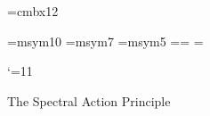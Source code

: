 
\hsize=125mm
\vsize=180mm
\hoffset=3mm
\voffset=12mm

\baselineskip=14pt


\font\twelvebf=cmbx12

\font\tenbb=msym10
\font\sevenbb=msym7
\font\fivebb=msym5
\newfam\bbfam
\textfont\bbfam=\tenbb \scriptfont\bbfam=\sevenbb
\scriptscriptfont\bbfam=\fivebb
\def\bb{\fam\bbfam}

\def\Cb{{\bb C}}
\def\Hb{{\bb H}}
\def\Rb{{\bb R}}
\def\Ab{{\bb A}}
\def\Bb{{\bb B}}
\def\Eb{{\bb E}}
\def\Zb{{\bb Z}}


\def\Ac{{\cal A}}
\def\Hc{{\cal H}}
\def\Lc{{\cal L}}
\def\Uc{{\cal U}}


\def\Diff{\mathop{\rm Diff}\nolimits}
\def\Aut{\mathop{\rm Aut}\nolimits}
\def\Trace{\mathop{\rm Trace}\nolimits}
\def\Spectrum{\mathop{\rm Spectrum}\nolimits}
\def\Tr{\mathop{\rm Tr}\nolimits}
\def\Re{\mathop{\rm Re}\nolimits}
\def\Res{\mathop{\rm Res}\nolimits}
\def\Gev{\mathop{\rm Gev}\nolimits}
\def\range{\mathop{\rm range}\nolimits}
\def\Int{\mathop{\rm Int}\nolimits}
\def\Out{\mathop{\rm Out}\nolimits}
\def\Sup{\mathop{\rm Sup}\nolimits}


\def\Lb{\Lambda}
\def\lb{\lambda}
\def\g{\gamma}
\def\vp{\varphi}
\def\a{\alpha}
\def\b{\beta}
\def\g{\gamma}
\def\G{\Gamma}
\def\s{\sigma}
\def\Si{\Sigma}
\def\om{\omega}
\def\Om{\Omega}
\def\d{\delta}
\def\t{\theta}
\def\k{\kappa}
\def\ve{\varepsilon}

\def\ts{\times}
\def\ify{\infty}
\def\fl{\forall}
\def\op{\oplus}
\def\ra{\rightarrow}
\def\wt{\widetilde}
\def\ot{\otimes}
\def\part{\partial}
\def\lgl{\langle}
\def\rgl{\rangle}
\def\nb{\nabla}
\def\eqv{\equiv}
\def\apx{\approx}
\def\sm{\simeq}
\def\sbs{\subset}

\def\un{{\rm 1\mkern-4mu I}}

\def\up#1{\raise 1ex\hbox{\sevenrm#1}}

\def\semi{\mathop{>\!\!\!\triangleleft}}

\catcode`\@=11
\def\displaylinesno #1{\displ@y\halign{
\hbox to\displaywidth{$\@lign\hfil\displaystyle##\hfil$}&
\llap{$##$}\crcr#1\crcr}}





\vglue 1cm

\centerline{\twelvebf The Spectral Action Principle}

